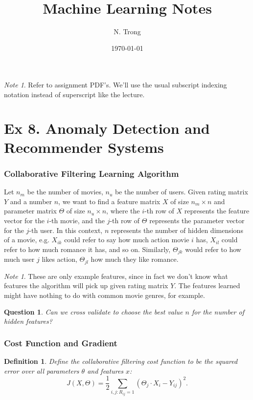 \documentclass[12pt]{article}
\title{Machine Learning Notes}
\author{N. Trong}
\date{\today}                                           %
\theoremstyle{plain}
\newtheorem{quest}[thm]{Question}
\newtheorem{defn}[thm]{Definition}
\theoremstyle{definition}
\theoremstyle{remark}
\newtheorem{note}[thm]{Note}
\begin{document}
\maketitle

\begin{note}
Refer to assignment PDF's. We'll use the usual subscript indexing notation instead of superscript like the lecture.
\end{note}

\part{Ex 8. Anomaly Detection and Recommender Systems}

\section{Collaborative Filtering Learning Algorithm}

Let $n_m$ be the number of movies, $n_u$ be the number of users. Given rating matrix $Y$ and a number $n$, we want to find a feature matrix $X$ of size $n_m \times n$ and parameter matrix $\Theta$ of size $n_u \times n$, where the $i$-th row of $X$ represents the feature vector for the $i$-th movie, and the $j$-th row of $\Theta$ represents the parameter vector for the $j$-th user. In this context, $n$ represents the number of hidden dimensions of a movie, e.g. $X_{ik}$ could refer to say how much action movie $i$ has, $X_{il}$ could refer to how much romance it has, and so on. Similarly, $\Theta_{jk}$ would refer to how much user $j$ likes action, $\Theta_{jl}$ how much they like romance.

\begin{note}
These are only example features, since in fact we don't know what features the algorithm will pick up given rating matrix $Y$. The features learned might have nothing to do with common movie genres, for example.
\end{note}

\begin{quest}
Can we cross validate to choose the best value $n$ for the number of hidden features?
\end{quest}

\section{Cost Function and Gradient}

\begin{defn}
Define the collaborative filtering cost function to be the squared error over all parameters $\theta$ and features $x$:
$$J(X, \Theta) = \frac{1}{2} \sum_{i,j:R_{ij}=1} (\Theta_j \cdot X_i - Y_{ij})^2.$$ 
\end{defn}
\end{document}
